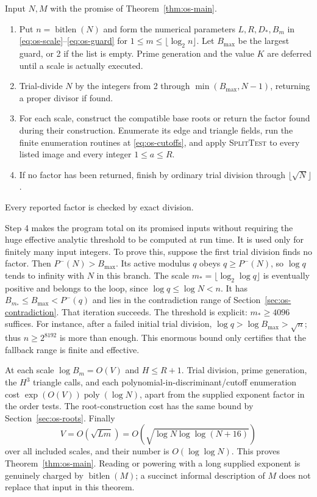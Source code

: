 \begin{algorithm}
\label{alg:os-full}
Input $N,M$ with the promise of Theorem~\ref{thm:os-main}.
\begin{enumerate}
\item Put $n=\operatorname{bitlen}(N)$ and form the numerical parameters
      $L,R,D_*,B_m$ in \eqref{eq:os-scale}--\eqref{eq:os-guard} for
      $1\leq m\leq\lfloor\log_2n\rfloor$.
      Let $B_{\max}$ be the largest guard, or 2 if the list is empty.
      Prime generation and the value $K$ are deferred until a scale is
      actually executed.
\item Trial-divide $N$ by the integers from 2 through
      $\min(B_{\max},N-1)$, returning a proper divisor if found.
\item For each scale, construct the compatible base roots or return
      the factor found during their construction.  Enumerate its edge
      and triangle fields, run the finite enumeration routines at
      \eqref{eq:os-cutoffs}, and apply \textsc{SplitTest} to every
      listed image and every integer $1\leq a\leq R$.
\item If no factor has been returned, finish by ordinary trial division
      through $\lfloor\sqrt N\rfloor$.
\end{enumerate}
Every reported factor is checked by exact division.
\end{algorithm}

Step 4 makes the program total on its promised inputs without requiring
the huge effective analytic threshold to be computed at run time.
It is used only for finitely many input integers.  To prove this,
suppose the first trial division finds no factor.  Then
$P^-(N)>B_{\max}$.  Its active modulus $q$ obeys
$q\geq P^-(N)$, so $\log q$ tends to infinity with $N$ in this branch.
The scale
$m_* =\lfloor\log_2\log q\rfloor$ is eventually positive and belongs
to the loop, since $\log q\leq\log N<n$.
It has $B_{m_*}\leq B_{\max}<P^-(q)$ and lies in the contradiction
range of Section~\ref{sec:os-contradiction}.  That iteration succeeds.
The threshold is explicit: $m_*\geq4096$ suffices.
For instance, after a failed initial trial division,
$\log q>\log B_{\max}>\sqrt n$; thus
$n\geq2^{8192}$ is more than enough.  This enormous bound only
certifies that the fallback range is finite and effective.

At each scale $\log B_m=O(V)$ and $H\leq R+1$.
Trial division, prime generation, the $H^3$ triangle calls, and each
polynomial-in-discriminant/cutoff enumeration cost
$\exp(O(V))\operatorname{poly}(\log N)$, apart from the supplied
exponent factor in the order tests.  The root-construction cost has the
same bound by Section~\ref{sec:os-roots}.  Finally
\[
 V=O(\sqrt{Lm})
   =O(\sqrt{\log N\log\log(N+16)})
\]
over all included scales, and their number is $O(\log\log N)$.
This proves Theorem~\ref{thm:os-main}.  Reading or powering with a long
supplied exponent is genuinely charged by
$\operatorname{bitlen}(M)$; a succinct informal description of $M$
does not replace that input in this theorem.

